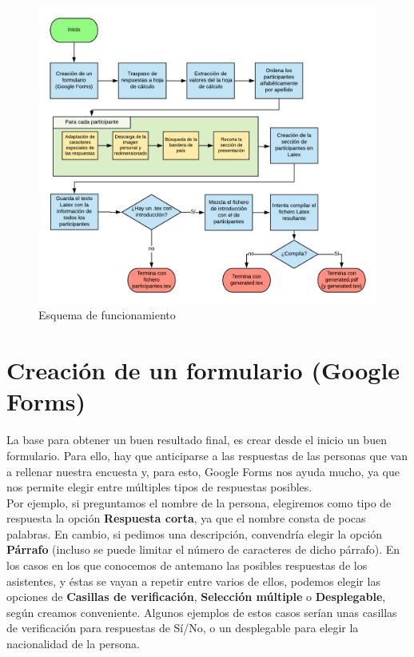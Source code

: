 \documentclass[a4paper, 12pt]{book}
\begin{document}
\begin{figure}[h!]
	\centering
	\includegraphics[width=12cm, keepaspectratio]{img/Esquema}
	\caption{Esquema de funcionamiento}
	\label{fig:esquema}
\end{figure}


\section{Creación de un formulario (Google Forms)}
\label{sec:formulario}
La base para obtener un buen resultado final, es crear desde el inicio un buen formulario. Para ello, hay que anticiparse a las respuestas de las personas que van a rellenar nuestra encuesta y, para esto, Google Forms nos ayuda mucho, ya que nos permite elegir entre múltiples tipos de respuestas posibles.\\

Por ejemplo, si preguntamos el nombre de la persona, elegiremos como tipo de respuesta la opción \textbf{Respuesta corta}, ya que el nombre consta de pocas palabras. En cambio, si pedimos una descripción, convendría elegir la opción \textbf{Párrafo} (incluso se puede limitar el número de caracteres de dicho párrafo). En los casos en los que conocemos de antemano las posibles respuestas de los asistentes, y éstas se vayan a repetir entre varios de ellos, podemos elegir las opciones de \textbf{Casillas de verificación}, \textbf{Selección múltiple} o \textbf{Desplegable}, según creamos conveniente. Algunos ejemplos de estos casos serían unas casillas de verificación para respuestas de Sí/No, o un desplegable para elegir la nacionalidad de la persona.\\
\end{document}
